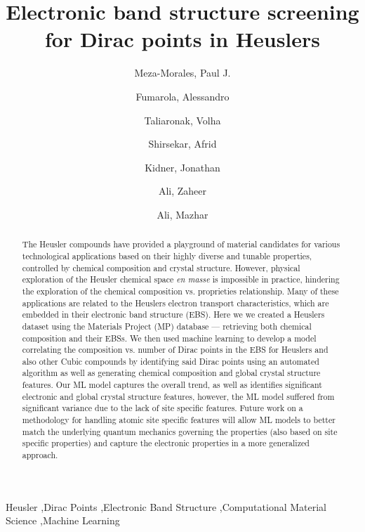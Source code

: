 \documentclass[article]{elsarticle}
\begin{document}
\begin{frontmatter}

\title{Electronic band structure screening for Dirac points in Heuslers}

\author[1]{Meza-Morales, Paul J.}
\author[1]{Fumarola, Alessandro}
\author[1]{Taliaronak, Volha}
\author[1]{Shirsekar, Afrid}
\author[1]{Kidner, Jonathan}
\author[1]{Ali, Zaheer}
\author[1]{Ali, Mazhar}
\address[1]{Material Mind, Fremont, CA 94555, United States}

\begin{abstract}
The  Heusler compounds have provided a playground of material candidates for various technological applications based on their highly diverse and tunable properties, controlled by chemical composition and crystal structure. However, physical exploration of the Heusler chemical space \textit{en masse} is impossible in practice, hindering the exploration of the chemical composition vs. proprieties relationship. Many of these applications are related to the Heuslers electron transport characteristics, which are embedded in their electronic band structure (EBS). Here we we created a Heuslers dataset using the Materials Project (MP) database --- retrieving both chemical composition and their EBSs. We then used machine learning to develop a model correlating the composition vs. number of Dirac points in the EBS for Heuslers and also other Cubic compounds by identifying said Dirac points using an automated algorithm as well as generating chemical composition and global crystal structure features. Our ML model captures the overall trend, as well as identifies significant electronic and global crystal structure features, however, the ML model suffered from  significant variance due to the lack of site specific features. Future work on a methodology for handling atomic site specific features will allow ML models to better match the underlying quantum mechanics governing the properties (also based on site specific properties) and capture the electronic properties in a more generalized approach.


\end{abstract}

\begin{keyword}
Heusler \sep Dirac Points \sep Electronic Band Structure \sep Computational Material Science \sep Machine Learning
\end{keyword}

\end{frontmatter}
\end{document}
